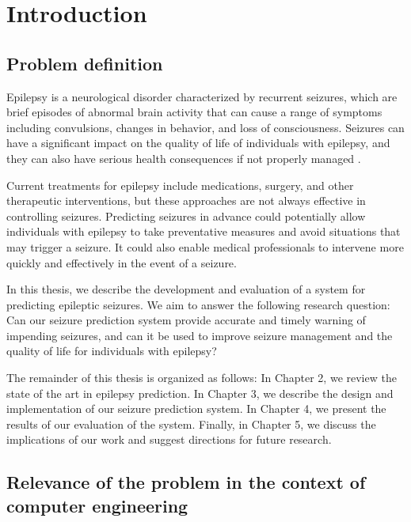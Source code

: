 \chapter{Introduction}
\section{Problem definition}
Epilepsy is a neurological disorder characterized by recurrent seizures, which are brief episodes of abnormal brain activity that can cause a range of symptoms including convulsions, changes in behavior, and loss of consciousness. Seizures can have a significant impact on the quality of life of individuals with epilepsy, and they can also have serious health consequences if not properly managed \cite{fisher_ilae_2014} \cite{stafstrom_seizures_2015}. 

Current treatments for epilepsy include medications, surgery, and other therapeutic interventions, but these approaches are not always effective in controlling seizures. Predicting seizures in advance could potentially allow individuals with epilepsy to take preventative measures and avoid situations that may trigger a seizure. It could also enable medical professionals to intervene more quickly and effectively in the event of a seizure.

In this thesis, we describe the development and evaluation of a system for predicting epileptic seizures. We aim to answer the following research question: Can our seizure prediction system provide accurate and timely warning of impending seizures, and can it be used to improve seizure management and the quality of life for individuals with epilepsy?

The remainder of this thesis is organized as follows: In Chapter 2, we review the state of the art in epilepsy prediction. In Chapter 3, we describe the design and implementation of our seizure prediction system. In Chapter 4, we present the results of our evaluation of the system. Finally, in Chapter 5, we discuss the implications of our work and suggest directions for future research.

\section{Relevance of the problem in the context of computer engineering}
